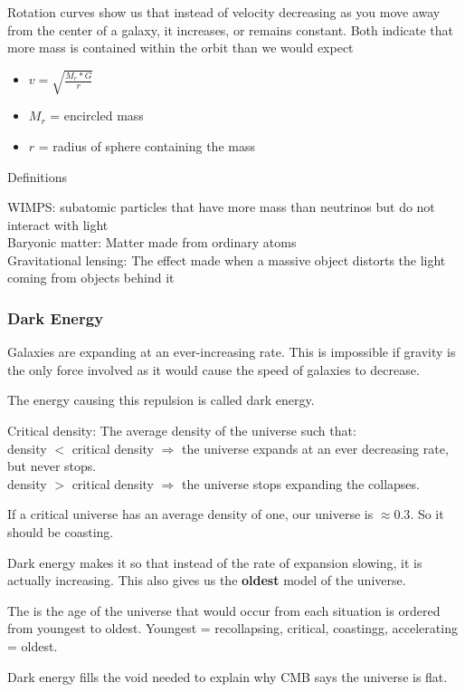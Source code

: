 Rotation curves show us that instead of velocity decreasing as you move away from the center of a galaxy, it increases, or remains constant.  Both indicate that more mass is contained within the orbit than we would expect

\begin{itemize}
\item $v = \sqrt{\frac{M_r * G}{r}}$
\item $M_r$ = encircled mass
\item $r$ = radius of sphere containing the mass
\end{itemize}

Definitions

WIMPS: subatomic particles that have more mass than neutrinos but do not interact with light \\
Baryonic matter: Matter made from ordinary atoms \\
Gravitational lensing: The effect made when a massive object distorts the light coming from objects behind it

\subsubsection{Dark Energy}
Galaxies are expanding at an ever-increasing rate.  This is impossible if gravity is the only force involved as it would cause the speed of galaxies to decrease.

The energy causing this repulsion is called dark energy.

Critical density: The average density of the universe such that: \\
density $<$ critical density $\Rightarrow$ the universe expands at an ever decreasing rate, but never stops. \\
density $>$ critical density $\Rightarrow$ the universe stops expanding the collapses.

If a critical universe has an average density of one, our universe is $\approx 0.3$.  So it should be coasting.

Dark energy makes it so that instead of the rate of expansion slowing, it is actually increasing.  This also gives us the \textbf{oldest} model of the universe.

The is the age of the universe that would occur from each situation is ordered from youngest to oldest.  Youngest = recollapsing, critical, coastingg, accelerating = oldest.

Dark energy fills the void needed to explain why CMB says the universe is flat.

